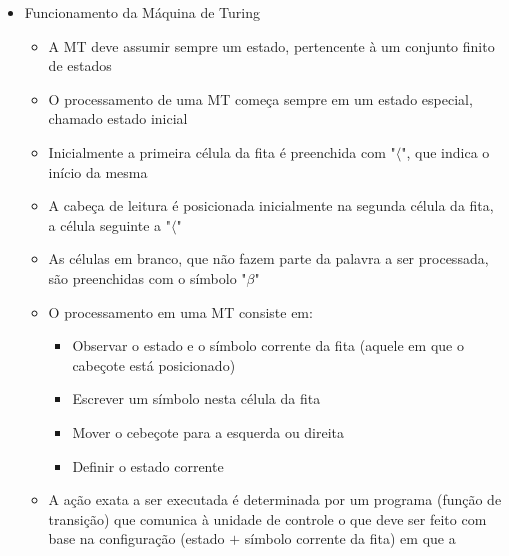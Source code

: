 \documentclass[12pt]{article}
\begin{document}
\begin{itemize}
\begin{itemize}
        dividida em células. Utilizada como dispositivo de entrada, saída e 
        memória de trabalho
        \begin{itemize}
            \item Estas células podem armazenar qualquer elemento de um conjunto 
            finito de símbolos, um alfabeto
        \end{itemize}
        \item Programa ou Função de Transição: função que comanda as leituras 
        e gravações, o sentido de movimento da cabeça e define o estado da 
        máquina que será ativado
        \item[] imagem
    \end{itemize}
    \item Funcionamento da Máquina de Turing
    \begin{itemize}
        \item A MT deve assumir sempre um estado, pertencente à um conjunto 
        finito de estados
        \item O processamento de uma MT começa sempre em um estado especial, 
        chamado estado inicial
        \item Inicialmente a primeira célula da fita é preenchida com "$\langle$", 
        que indica o início da mesma
        \item A cabeça de leitura é posicionada inicialmente na segunda célula 
        da fita, a célula seguinte a "$\langle$"
        \item As células em branco, que não fazem parte da palavra a ser 
        processada, são preenchidas com o símbolo "$\beta$"
        \item O processamento em uma MT consiste em:
        \begin{itemize}
            \item Observar o estado e o símbolo corrente da fita (aquele em que 
            o cabeçote está posicionado)
            \item Escrever um símbolo nesta célula da fita
            \item Mover o cebeçote para a esquerda ou direita
            \item Definir o estado corrente
        \end{itemize}
        \item A ação exata a ser executada é determinada por um programa (função 
        de transição) que comunica à unidade de controle o que deve ser feito 
        com base na configuração (estado $+$ símbolo corrente da fita) em que a 

\end{itemize}
\end{itemize}
\end{document}
